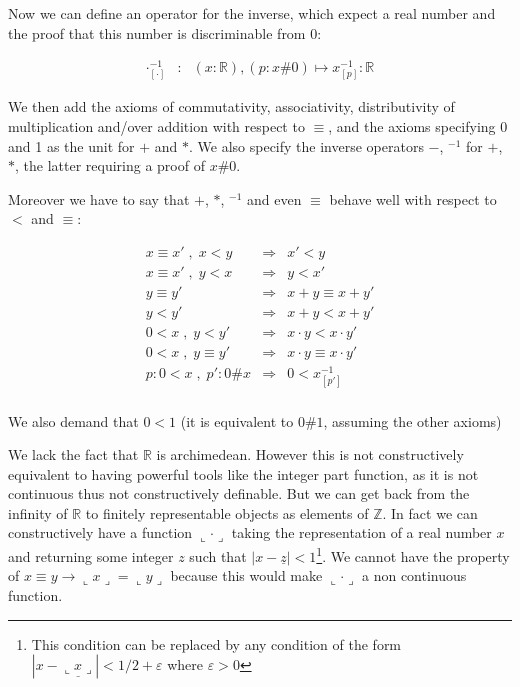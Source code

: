 \documentclass[a4paper,11pt]{article}
\newcommand{\R}{\mathbb{R}}
\newcommand{\Z}{\mathbb{Z}}
\theoremstyle{definition}
\theoremstyle{remark}
\begin{document}
Now we can define an operator for the inverse, which expect a real number and the
proof that this number is discriminable from 0:

  \[
  \begin{array}{ccl}
  \cdot^{-1}_{[\cdot]} & : & (x:\R), (p:x\#0) \mapsto x^{-1}_{[p]} : \R
  \end{array}
  \]

We then add the axioms of commutativity, associativity, distributivity of multiplication and/over
addition with respect to $≡$, and the axioms specifying 0 and 1 as the unit for $+$ and $*$. We also specify the inverse operators $-$, $^{-1}$ for $+$, $*$, the latter requiring a proof of $x\#0$.

Moreover we have to say that $+$, $*$, $^{-1}$ and even $≡$ behave well with respect to $<$ and $≡$:

  \[
  \begin{array}{rcl}
  x \equiv x' \;,\; x < y   &  \Rightarrow  & x' < y \\
  x \equiv x' \;,\; y < x   &  \Rightarrow  & y < x' \\
  y \equiv y'               &  \Rightarrow  & x + y \equiv x + y' \\
  y < y'                    &  \Rightarrow  & x + y < x + y' \\
  0 < x \;,\; y < y'        &  \Rightarrow  & x \cdot y < x \cdot y' \\
  0 < x \;,\; y \equiv y'   &  \Rightarrow  & x \cdot y \equiv x \cdot y' \\
  p:0<x \;,\;  p':0\#x      &  \Rightarrow  & 0 < x^{-1}_{[p']} \\
  \end{array}
  \]

We also demand that $0<1$ (it is equivalent to $0\#1$, assuming the other axioms)

We lack the fact that $\R$ is archimedean. However this is not constructively equivalent to having powerful tools like the integer part function, as it is not continuous thus not constructively definable. But we can get back from the infinity of $\R$ to finitely representable objects as elements of $\Z$. In fact we can constructively have a function $\llcorner \cdot \lrcorner$ taking the representation of a real number $x$ and returning some integer $z$ such that $| x-\underline z | < 1$\footnote{This condition can be replaced by any condition of the form $| x-\underline {\llcorner x \lrcorner} | < 1/2+\varepsilon$ where $\varepsilon>0$}. We cannot have the property of $x≡y → \llcorner x \lrcorner=\llcorner y \lrcorner$ because this would make $\llcorner \cdot \lrcorner$ a non continuous function.
\end{document}
